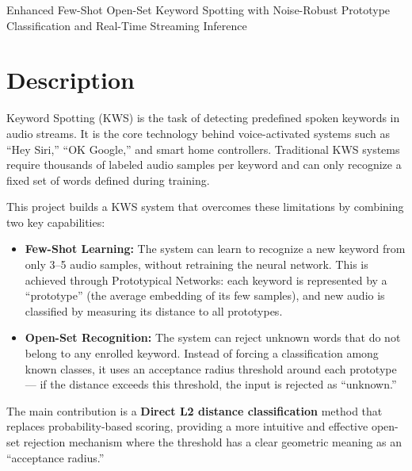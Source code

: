 \documentclass[12pt,a4paper]{article}
\begin{document}
Enhanced Few-Shot Open-Set Keyword Spotting with Noise-Robust Prototype Classification and Real-Time Streaming Inference

\section*{Description}

Keyword Spotting (KWS) is the task of detecting predefined spoken keywords in audio streams. It is the core technology behind voice-activated systems such as ``Hey Siri,'' ``OK Google,'' and smart home controllers. Traditional KWS systems require thousands of labeled audio samples per keyword and can only recognize a fixed set of words defined during training.

This project builds a KWS system that overcomes these limitations by combining two key capabilities:

\begin{itemize}[leftmargin=1.5cm]
    \item \textbf{Few-Shot Learning:} The system can learn to recognize a new keyword from only 3--5 audio samples, without retraining the neural network. This is achieved through Prototypical Networks: each keyword is represented by a ``prototype'' (the average embedding of its few samples), and new audio is classified by measuring its distance to all prototypes.

    \item \textbf{Open-Set Recognition:} The system can reject unknown words that do not belong to any enrolled keyword. Instead of forcing a classification among known classes, it uses an acceptance radius threshold around each prototype --- if the distance exceeds this threshold, the input is rejected as ``unknown.''
\end{itemize}

The main contribution is a \textbf{Direct L2 distance classification} method that replaces probability-based scoring, providing a more intuitive and effective open-set rejection mechanism where the threshold has a clear geometric meaning as an ``acceptance radius.''
\end{document}
